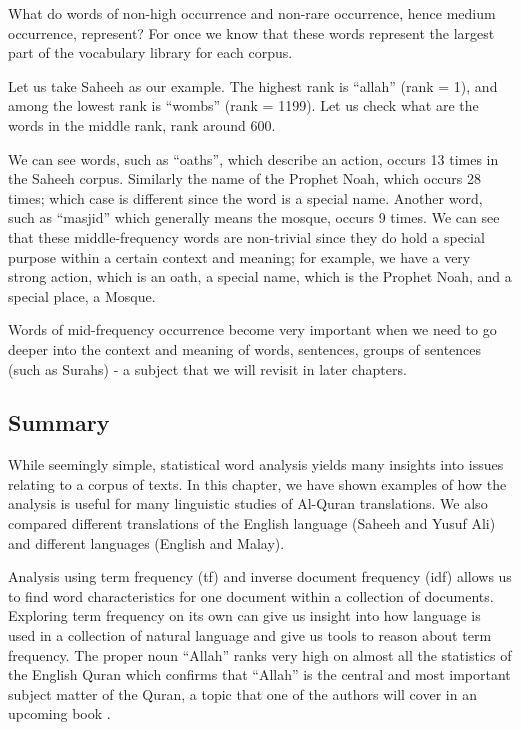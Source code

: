 \documentclass[
]{article}
\begin{document}
What do words of non-high occurrence and non-rare occurrence, hence medium occurrence, represent? For once we know that these words represent the largest part of the vocabulary library for each corpus.

Let us take Saheeh as our example. The highest rank is ``allah'' (rank = 1), and among the lowest rank is ``wombs'' (rank = 1199). Let us check what are the words in the middle rank, rank around 600.

\footnotesize

\normalsize

We can see words, such as ``oaths'', which describe an action, occurs 13 times in the Saheeh corpus. Similarly the name of the Prophet Noah, which occurs 28 times; which case is different since the word is a special name. Another word, such as ``masjid'' which generally means the mosque, occurs 9 times. We can see that these middle-frequency words are non-trivial since they do hold a special purpose within a certain context and meaning; for example, we have a very strong action, which is an oath, a special name, which is the Prophet Noah, and a special place, a Mosque.

Words of mid-frequency occurrence become very important when we need to go deeper into the context and meaning of words, sentences, groups of sentences (such as Surahs) - a subject that we will revisit in later chapters.

\hypertarget{chapter-2-summary}{%
\subsection{Summary}\label{chapter-2-summary}}

While seemingly simple, statistical word analysis yields many insights into issues relating to a corpus of texts. In this chapter, we have shown examples of how the analysis is useful for many linguistic studies of Al-Quran translations. We also compared different translations of the English language (Saheeh and Yusuf Ali) and different languages (English and Malay).

Analysis using term frequency (tf) and inverse document frequency (idf) allows us to find word characteristics for one document within a collection of documents. Exploring term frequency on its own can give us insight into how language is used in a collection of natural language and give us tools to reason about term frequency. The proper noun ``Allah'' ranks very high on almost all the statistics of the English Quran which confirms that ``Allah'' is the central and most important subject matter of the Quran, a topic that one of the authors will cover in an upcoming book \citep{alsuwaidan2021}.
\end{document}
